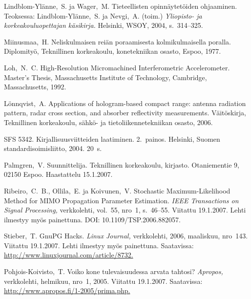 \documentclass[english, 12pt, a4paper, elec, utf8, a-1b, online]{aaltothesis}
\begin{document}
\begin{thebibliography}{99}
 Lindblom-Yl\"anne,\ S. ja Wager,\ M.  Tieteellisten
  opinn\"aytet\"oiden ohjaaminen. Teoksessa: Lindblom-Yl\"anne,\ S. ja
  Nevgi,\ A. (toim.) \textit{Yliopisto- ja korkeakouluopettajan
    k\"asikirja.}  Helsinki, WSOY, 2004, s.\ 314--325.
 
 Miinusmaa,\ H. Neliskulmaisen rei\"an poraamisesta
  kolmikulmaisella poralla. Diplomity\"o, Teknillinen korkeakoulu,
  konetekniikan osasto, Espoo, 1977.

 Loh,\ N.\ C. High-Resolution Micromachined
  Interferometric Accelerometer. Master's Thesis, Massachusetts
  Institute of Technology, Cambridge,
  \foreignlanguage{english}{Massachusetts,} 1992.

 L\"onnqvist,\ A.
  \foreignlanguage{english}{Applications of hologram-based compact
    range: antenna radiation pattern, radar cross section, and
    absorber reflectivity measurements.}
  V\"ait\"oskirja, Teknillinen korkeakoulu, s\"ahk\"o- ja tietoliikennetekniikan
  osasto, 2006.

 SFS 5342. Kirjallisuusviitteiden laatiminen. 2.\ painos.
  Helsinki, Suomen standardisoimisliitto, 2004. 20~s.

 Palmgren,\ V. Suunnittelija. Teknillinen
  korkeakoulu, kirjasto. Otaniementie 9, 02150 Espoo. Haastattelu
  15.1.2007.

 Ribeiro,\ C.\ B., Ollila,\ E. ja Koivunen,\ V.
  \foreignlanguage{english}{Stochastic Maximum-Likelihood Method for
    MIMO Propagation Parameter Estimation.}
 \textit{IEEE Transactions
    on Signal Processing,} verkkolehti, vol.\ 55, nro~1, s.\ 46--55.
  Viitattu 19.1.2007. Lehti ilmestyy my\"os painettuna. DOI:
  10.1109/TSP.2006.882057.

 Stieber,\ T. GnuPG Hacks. \textit{Linux Journal,}
  verkkolehti, 2006, maaliskuu, nro~143. Viitattu 19.1.2007. Lehti
  ilmestyy my\"os painettuna. Saatavissa:
  \url{http://www.linuxjournal.com/article/8732.}

 Pohjois-Koivisto,\ T. Voiko kone tulevaisuudessa arvata
  tahtosi?  \textit{Apropos,} verkkolehti, helmikuu, nro~1, 2005.
  Viitattu 19.1.2007.  Saatavissa:
  \url{http://www.apropos.fi/1-2005/prima.php.}


\end{thebibliography}
\end{document}

